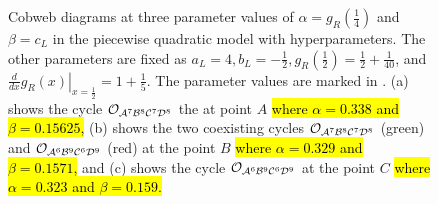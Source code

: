 \begin{figure}
	\centering
	\caption[Cobwebs of the piecewise quadratic model with hyperparameters for different values of the fixed parameters]{
	Cobweb diagrams at three parameter values of $\alpha = g_R\left(\frac{1}{4}\right)$ and $\beta = c_L$ in the piecewise quadratic model with hyperparameters.
	The other parameters are fixed as $a_L = 4, b_L = -\frac{1}{2}, g_R\left(\frac{1}{2}\right) = \frac{1}{2} + \frac{1}{40}$, and $\left. \frac{d}{dx} g_R(x) \right|_{x = \frac{1}{2}} = 1 + \frac{1}{5}$.
	The parameter values are marked in .
	(a) shows the cycle $\mathcal{O}_{\mathcal{A}^7\mathcal{B}^8\mathcal{C}^7\mathcal{D}^8}$ the at point $A$ \hl{where $\alpha = 0.338$ and $\beta = 0.15625$,}
	(b) shows the two coexisting cycles $\mathcal{O}_{\mathcal{A}^7\mathcal{B}^8\mathcal{C}^7\mathcal{D}^8}$ (green) and $\mathcal{O}_{\mathcal{A}^6\mathcal{B}^9\mathcal{C}^6\mathcal{D}^9}$ (red) at the point $B$ \hl{where $\alpha = 0.329$ and $\beta = 0.1571$,}
	and (c) shows the cycle $\mathcal{O}_{\mathcal{A}^6\mathcal{B}^9\mathcal{C}^6\mathcal{D}^9}$ at the point $C$ \hl{where $\alpha = 0.323$ and $\beta = 0.159$.}
	}
	\label{fig:setup.quad.hyper.2.cobwebs}
\end{figure}

